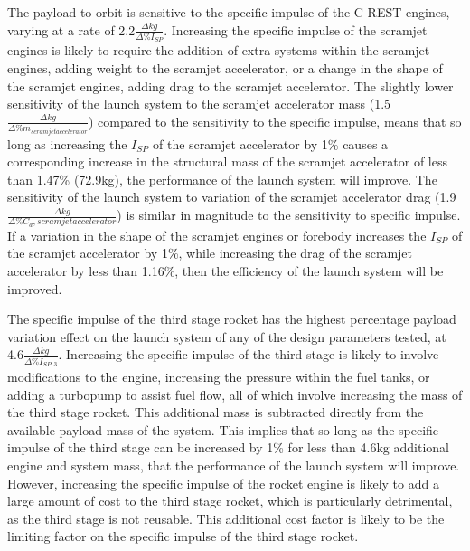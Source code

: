 The payload-to-orbit is sensitive to the specific impulse of the C-REST engines, varying at a rate of 2.2$\frac{\Delta kg}{\Delta\%I_{SP}}$. Increasing the specific impulse of the scramjet engines is likely to require the addition of extra systems within the scramjet engines, adding weight to the scramjet accelerator, or a change in the shape of the scramjet engines, adding drag to the scramjet accelerator. 
The slightly lower sensitivity of the launch system to the scramjet accelerator mass (1.5$\frac{\Delta kg}{\Delta\%m_{scramjet accelerator}}$) compared to the sensitivity to the specific impulse, means that so long as increasing the $I_{SP}$ of the scramjet accelerator by 1\% causes a corresponding increase in the structural mass of the scramjet accelerator of less than 1.47\% (72.9kg), the performance of the launch system will improve. 
The sensitivity of the launch system to variation of the scramjet accelerator drag (1.9$\frac{\Delta kg}{\Delta\%C_d,{scramjet accelerator}}$) is similar in magnitude to the sensitivity to specific impulse. 
If a variation in the shape of the scramjet engines or forebody increases the $I_{SP}$ of the scramjet accelerator by 1\%, while increasing the drag of the scramjet accelerator by less than 1.16\%, then the efficiency of the launch system will be improved. 


 The specific impulse of the third stage rocket has the highest percentage payload variation effect on the launch system of any of the design parameters tested, at 4.6$\frac{\Delta kg}{\Delta\%I_{SP,3}}$. Increasing the specific impulse of the third stage is likely to involve modifications to the engine, increasing the pressure within the fuel tanks, or adding a turbopump to assist fuel flow, all of which involve increasing the mass of the third stage rocket. 
This additional mass is subtracted directly from the available payload mass of the system. This implies that so long as the specific impulse of the third stage can be increased by 1\% for less than 4.6kg additional engine and system mass, that the performance of the launch system will improve. 
However, increasing the specific impulse of the rocket engine is likely to add a large amount of cost to the third stage rocket, which is particularly detrimental, as the third stage is not reusable. This additional cost factor is likely to be the limiting factor on the specific impulse of the third stage rocket. 

